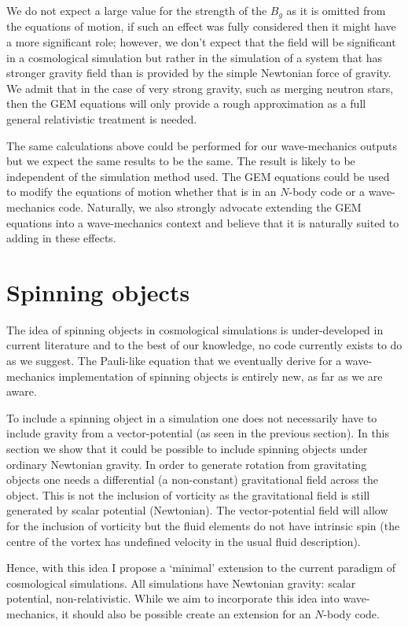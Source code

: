 We do not expect a large value for the strength of the $B_g$ as it is omitted from the equations of motion, if such an effect was fully considered then it might have a more significant role; however, we don't expect that the field will be significant in a cosmological simulation but rather in the simulation of a system that has stronger gravity field than is provided by the simple Newtonian force of gravity. We admit that in the case of very strong gravity, such as merging neutron stars, then the GEM equations will only provide a rough approximation as a full general relativistic treatment is needed.

The same calculations above could be performed for our wave-mechanics outputs but we expect the same results to be the same. The result is likely to be independent of the simulation method used. The GEM equations could be used to modify the equations of motion whether that is in an $N$-body code or a wave-mechanics code. Naturally, we also strongly advocate extending the GEM equations into a wave-mechanics context and believe that it is naturally suited to adding in these effects.

\section{Spinning objects}
\label{spinobj}
The idea of spinning objects in cosmological simulations is under-developed in current literature and to the best of our knowledge, no code currently exists to do as we suggest. The Pauli-like equation that we eventually derive for a wave-mechanics implementation of spinning objects is entirely new, as far as we are aware.

To include a spinning object in a simulation one does not necessarily have to include gravity from a vector-potential (as seen in the previous section). In this section we show that it could be possible to include spinning objects under ordinary Newtonian gravity. In order to generate rotation from gravitating objects one needs a differential (a non-constant) gravitational field across the object. This is not the inclusion of vorticity as the gravitational field is still generated by scalar potential (Newtonian). The vector-potential field will allow for the inclusion of vorticity but the fluid elements do not have intrinsic spin (the centre of the vortex has undefined velocity in the usual fluid description).

Hence, with this idea I propose a `minimal' extension to the current paradigm of cosmological simulations. All simulations have Newtonian gravity: scalar potential, non-relativistic. While we aim to incorporate this idea into wave-mechanics, it should also be possible create an extension for an $N$-body code.

